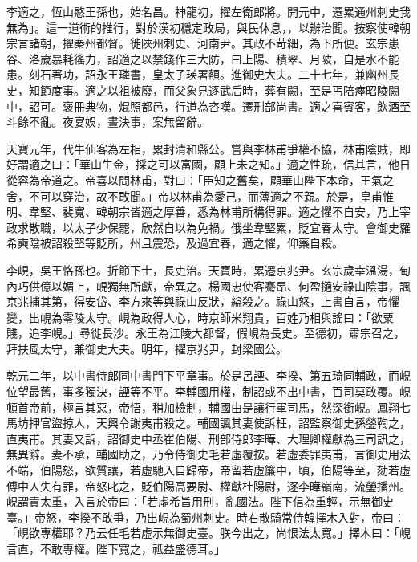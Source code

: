 
\begin{pinyinscope}

 李適之，恆山愍王孫也，始名昌。神龍初，擢左衛郎將。開元中，遷累通州刺史我無為」。這一道術的推行，對於漢初穩定政局，與民休息，，以辦治聞。按察使韓朝宗言諸朝，擢秦州都督。徙陜州刺史、河南尹。其政不苛細，為下所便。玄宗患谷、洛歲暴耗徭力，詔適之以禁錢作三大防，曰上陽、積翠、月陂，自是水不能患。刻石著功，詔永王璘書，皇太子瑛署額。進御史大夫。二十七年，兼幽州長史，知節度事。適之以祖被廢，而父象見逐武后時，葬有闕，至是丐陪瘞昭陵闕中，詔可。褒冊典物，焜照都邑，行道為咨嘆。遷刑部尚書。適之喜賓客，飲酒至斗餘不亂。夜宴娛，晝決事，案無留辭。



 天寶元年，代牛仙客為左相，累封清和縣公。嘗與李林甫爭權不協，林甫陰賊，即好謂適之曰：「華山生金，採之可以富國，顧上未之知。」適之性疏，信其言，他日從容為帝道之。帝喜以問林甫，對曰：「臣知之舊矣，顧華山陛下本命，王氣之舍，不可以穿治，故不敢聞。」帝以林甫為愛己，而薄適之不親。於是，皇甫惟明、韋堅、裴寬、韓朝宗皆適之厚善，悉為林甫所構得罪。適之懼不自安，乃上宰政求散職，以太子少保罷，欣然自以為免禍。俄坐韋堅累，貶宜春太守。會御史羅希奭陰被詔殺堅等貶所，州且震恐，及過宜春，適之懼，仰藥自殺。



 李峴，吳王恪孫也。折節下士，長吏治。天寶時，累遷京兆尹。玄宗歲幸溫湯，甸內巧供億以媚上，峴獨無所獻，帝異之。楊國忠使客騫昂、何盈擿安祿山陰事，諷京兆捕其第，得安岱、李方來等與祿山反狀，縊殺之。祿山怒，上書自言，帝懼變，出峴為零陵太守。峴為政得人心，時京師米翔貴，百姓乃相與謠曰：「欲粟賤，追李峴。」尋徙長沙。永王為江陵大都督，假峴為長史。至德初，肅宗召之，拜扶風太守，兼御史大夫。明年，擢京兆尹，封梁國公。



 乾元二年，以中書侍郎同中書門下平章事。於是呂諲、李揆、第五琦同輔政，而峴位望最舊，事多獨決，諲等不平。李輔國用權，制詔或不出中書，百司莫敢覆。峴頓首帝前，極言其惡，帝悟，稍加檢制，輔國由是讓行軍司馬，然深銜峴。鳳翔七馬坊押官盜掠人，天興令謝夷甫殺之。輔國諷其妻使訴枉，詔監察御史孫鎣鞫之，直夷甫。其妻又訴，詔御史中丞崔伯陽、刑部侍郎李曄、大理卿權獻為三司訊之，無異辭。妻不承，輔國助之，乃令侍御史毛若虛覆按。若虛委罪夷甫，言御史用法不端，伯陽怒，欲質讓，若虛馳入自歸帝，帝留若虛簾中，頃，伯陽等至，劾若虛傅中人失有罪，帝怒叱之，貶伯陽高要尉、權獻杜陽尉，逐李曄嶺南，流鎣播州。峴謂責太重，入言於帝曰：「若虛希旨用刑，亂國法。陛下信為重輕，示無御史臺。」帝怒，李揆不敢爭，乃出峴為蜀州刺史。時右散騎常侍韓擇木入對，帝曰：「峴欲專權耶？乃云任毛若虛示無御史臺。朕今出之，尚恨法太寬。」擇木曰：「峴言直，不敢專權。陛下寬之，祗益盛德耳。」




\end{pinyinscope}
